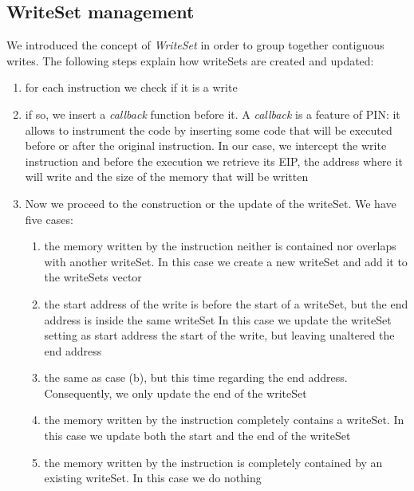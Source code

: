 \subsection{WriteSet management}
We introduced the concept of \textit{WriteSet} in order to group together contiguous writes. The following steps explain how writeSets are created and updated:
\begin{enumerate}
\item for each instruction we check if it is a write
\item if so, we insert a \textit{callback} function before it. A \textit{callback} is a feature of PIN: it allows to instrument the code by inserting some code that will be executed before or after the original instruction. In our case, we intercept the write instruction and before the execution we retrieve its EIP, the address where it will write and the size of the memory that will be written
\item Now we proceed to the construction or the update of the writeSet. We have five cases:
	\begin{enumerate}
	\item the memory written by the instruction neither is contained nor overlaps with another writeSet. In this case we create a new writeSet and add it to the writeSets vector
	\item the start address of the write is before the start of a writeSet, but the end address is inside the same writeSet In this case we update the writeSet setting as start address the start of the write, but leaving unaltered the end address
	\item the same as case (b), but this time regarding the end address. Consequently, we only update the end of the writeSet 
	\item the memory written by the instruction completely contains a writeSet. In this case we update both the start and the end of the writeSet
	\item the memory written by the instruction is completely contained by an existing writeSet. In this case we do nothing
	\end{enumerate}
\end{enumerate}